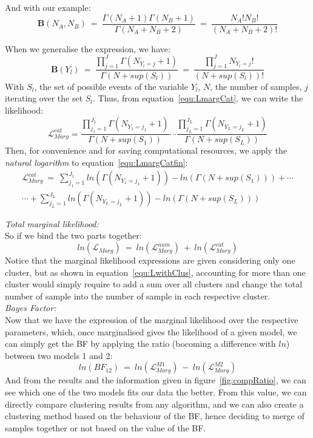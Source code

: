 \documentclass[twocolumn,12pt]{article}
\begin{document}
And with our example:\\
$$\textbf{B}(N_A,N_B)\ =\ \frac{\Gamma(N_A+1)\Gamma(N_B+1)}{\Gamma(N_A+N_B+2)}\ =\ \frac{N_A!N_B!}{(N_A+N_B+2)!}$$


When we generalise the expression, we have:
\begin{equation}
    \textbf{B}(Y_l)\ =\ \frac{\prod_{j=1}^J\Gamma(N_{Y_l=j}+1)}{\Gamma(N+sup(S_l))}\ =\ \frac{\prod_{j=1}^JN_{Y_l=j}!}{(N+sup(S_l))!}
\end{equation}
With $S_l$, the set of possible events of the variable $Y_l$, $N$, the number of samples, $j$ iterating over the set $S_l$.
Thus, from equation~\ref{equ:LmargCat}, we can write the likelihood:
\small{
\begin{equation}
     \mathcal{L}_{Marg}^{cat} = \frac{\prod_{j_1=1}^{J_1}\Gamma(N_{Y_1=j_1}+1)}{\Gamma(N+sup(S_1))}\cdots\frac{\prod_{j_L=1}^{J_L}\Gamma(N_{Y_L=j_L}+1)}{\Gamma(N+sup(S_L))}
     \label{equ:LmargCatfin}
\end{equation}
}
Then, for convenience and for saving computational resources, we apply the \emph{natural logarithm} to equation~\ref{equ:LmargCatfin}:
\small
\begin{align}
    \mathcal{L}_{Marg}^{cat}\ =\ \sum_{j_1=1}^{J_1}ln(\Gamma(N_{Y_1=j_1}+1))-ln(\Gamma(N+sup(S_1)))+\cdots\nonumber\\
 \cdots+\sum_{j_L=1}^{J_L}ln(\Gamma(N_{Y_L=j_L}+1))-ln(\Gamma(N+sup(S_L))) 
\end{align}

\emph{Total marginal likelihood:}\\
So if we bind the two parts together:
\begin{equation}
    ln(\mathcal{L}_{Marg})\ =\  ln(\mathcal{L}_{Marg}^{num})\ +\ ln(\mathcal{L}_{Marg}^{cat})
    \label{equ:finalLmargTot}
\end{equation}
Notice that the marginal likelihood expressions are given considering only one cluster, but as shown in equation~\ref{equ:LwithClus}, accounting for more than one cluster would simply require to add a sum over all clusters and change the total number of sample into the number of sample in each respective cluster.\\

\emph{Bayes Factor:}\\
Now that we have the expression of the marginal likelihood over the respective parameters, which, once marginalised gives the likelihood of a given model, we can simply get the BF by applying the ratio (bocoming a difference with $ln$) between two models 1 and 2:
\begin{equation}
    ln(BF_{12})\ =\ ln(\mathcal{L}_{Marg}^{M1})\ -\ ln(\mathcal{L}_{Marg}^{M2})
    \label{equ:lnLikeBF}
\end{equation}
And from the results and the information given in figure~\ref{fig:compRatio}, we can see which one of the two models fits our data the better.
From this value, we can directly compare clustering results from any algorithm, and we can also create a clustering method based on the behaviour of the BF, hence deciding to merge of samples together or not based on the value of the BF.
\end{document}
